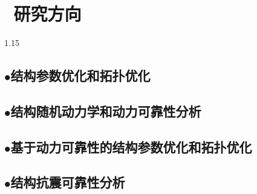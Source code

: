 \documentclass{resume}
\begin{document}
\vspace{-12pt}
\section{\faChartBar\, 研究方向}
\begin{spacing}{1.15}
\subsection{$\bullet$\;\;结构参数优化和拓扑优化}
\subsection{$\bullet$\;\;结构随机动力学和动力可靠性分析}
\subsection{$\bullet$\;\;基于动力可靠性的结构参数优化和拓扑优化}
\subsection{$\bullet$\;\;结构抗震可靠性分析}
\end{spacing}
\vspace{6pt}

\vspace{-12pt}
\end{document}

